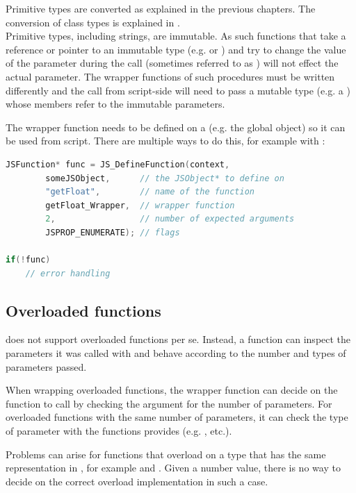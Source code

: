 Primitive types are converted as explained in the previous chapters. The conversion of class types is explained in . \\
Primitive types, including strings, are immutable. As such functions that take a reference or pointer to an immutable type (e.g.  or ) and try to change the value of the parameter during the call (sometimes referred to as ) will not effect the actual  parameter. The wrapper functions of such procedures must be written differently and the call from script-side will need to pass a mutable type (e.g. a ) whose members refer to the immutable parameters.

The wrapper function needs to be defined on a  (e.g. the global object) so it can be used from script. There are multiple ways to do this, for example with :

\SingleSpacing
\begin{lstlisting}[language=C++, caption=Defining a function]
JSFunction* func = JS_DefineFunction(context, 
        someJSObject,      // the JSObject* to define on
        "getFloat",        // name of the function
        getFloat_Wrapper,  // wrapper function
        2,                 // number of expected arguments 
        JSPROP_ENUMERATE); // flags
        
if(!func)
	// error handling
\end{lstlisting}
\OnehalfSpacing


\subsection{Overloaded functions}
\label{sec:OverloadedFunctions}

 does not support overloaded functions per se. Instead, a function can inspect the parameters it was called with and behave according to the number and types of parameters passed.

When wrapping overloaded functions, the wrapper function can decide on the  function to call by checking the  argument for the number of parameters. For overloaded functions with the same number of parameters, it can check the type of parameter with the functions  provides (e.g. , etc.).

Problems can arise for functions that overload on a type that has the same representation in , for example  and . Given a number value, there is no way to decide on the correct overload implementation in such a case.

